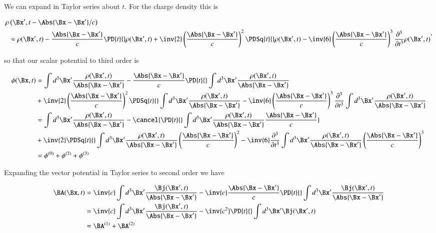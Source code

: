 We can expand in Taylor series about $t$.  For the charge density this is

\begin{equation}\label{eqn:relativisticElectrodynamicsL27:30}
\begin{aligned}
\rho&\left(\Bx', t - \Abs{\Bx - \Bx'}/c\right) \\
&\approx 
\rho(\Bx', t) 
- \frac{\Abs{\Bx - \Bx'}}{c} \PD{t}{} \rho(\Bx', t) 
+ \inv{2} \left(\frac{\Abs{\Bx - \Bx'}}{c}\right)^2 \PDSq{t}{} \rho(\Bx', t) 
- \inv{6} \left(\frac{\Abs{\Bx - \Bx'}}{c}\right)^3 \frac{\partial^3}{\partial t^3} \rho(\Bx', t) 
\end{aligned},
\end{equation}

so that our scalar potential to third order is

\begin{align*}
\phi(\Bx, t) 
&=
\int d^3 \Bx' \frac{\rho(\Bx', t) }{\Abs{\Bx - \Bx'}}
- \frac{\Abs{\Bx - \Bx'}}{c} \PD{t}{} \int d^3 \Bx' \frac{\rho(\Bx', t) }{\Abs{\Bx - \Bx'}} \\
&+ \inv{2} \left(\frac{\Abs{\Bx - \Bx'}}{c}\right)^2 \PDSq{t}{} \int d^3 \Bx' \frac{\rho(\Bx', t) }{\Abs{\Bx - \Bx'}}
- \inv{6} \left(\frac{\Abs{\Bx - \Bx'}}{c}\right)^3 \frac{\partial^3}{\partial t^3} \int d^3 \Bx' \frac{\rho(\Bx', t) }{\Abs{\Bx - \Bx'}} \\
&=
\int d^3 \Bx' \frac{\rho(\Bx', t) }{\Abs{\Bx - \Bx'}}
- 
\cancel{\PD{t}{} \int d^3 \Bx' \frac{\rho(\Bx', t) }{\Abs{\Bx - \Bx'}} 
\frac{\Abs{\Bx - \Bx'}}{c} }
\\
&+ \inv{2} 
\PDSq{t}{} \int d^3 \Bx' \frac{\rho(\Bx', t) }{\Abs{\Bx - \Bx'}}
\left(\frac{\Abs{\Bx - \Bx'}}{c}\right)^2 
- \inv{6} 
\frac{\partial^3}{\partial t^3} \int d^3 \Bx' \frac{\rho(\Bx', t) }{\Abs{\Bx - \Bx'}} 
\left(\frac{\Abs{\Bx - \Bx'}}{c}\right)^3  \\
&= \phi^{(0)} + \phi^{(2)} + \phi^{(3)}
\end{align*}

Expanding the vector potential in Taylor series to second order we have

\begin{align*}
\BA(\Bx, t) 
&=
\inv{c} \int d^3 \Bx' \frac{\Bj(\Bx', t) }{\Abs{\Bx - \Bx'}}
- \inv{c} \frac{\Abs{\Bx - \Bx'}}{c} \PD{t}{} \int d^3 \Bx' \frac{\Bj(\Bx', t) }{\Abs{\Bx - \Bx'}} \\
&=
\inv{c} \int d^3 \Bx' \frac{\Bj(\Bx', t) }{\Abs{\Bx - \Bx'}}
- 
\inv{c^2} \PD{t}{} \int d^3 \Bx' \Bj(\Bx', t) 
\\
&= \BA^{(1)} + \BA^{(2)} 
\end{align*}


